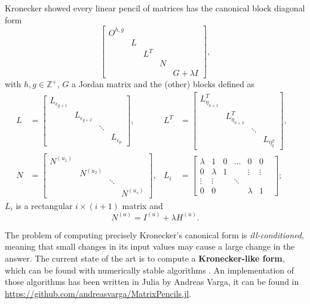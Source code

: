 \vspace{5mm}
Kronecker showed every linear pencil of matrices has the canonical block diagonal form
\[
\begin{bmatrix}
    O^{h, g} \\
    &L \\
    && L^T \\
    &&& N \\
    &&&& G + \lambda I
\end{bmatrix},
\]
with \(h, g \in \mathbb{Z}^+\), $G$ a Jordan matrix and the (other) blocks defined as
\begin{align*}
    L &= \begin{bmatrix}
        L_{\epsilon_{g+1}} \\
        & L_{\epsilon_{g+2}} \\
        & & \ddots \\
        & & & L_{\epsilon_{p}}
    \end{bmatrix}, &
    L^T &= \begin{bmatrix}
        L_{\eta_{h+1}}^T \\
        & L_{\eta_{h+2}}^T \\
        & & \ddots \\
        & & & L_{\eta_{q}^T}
    \end{bmatrix}, &\\
    N &= \begin{bmatrix}
        N^{(u_{1})} \\
        & N^{(u_{2})} \\ 
        & & \ddots \\
        & & & N^{(u_{s})}
    \end{bmatrix}, &
    L_{i} &=
    \begin{bmatrix}
        \lambda        &      1     &       0      &     \ldots       &    0       &    0   \\
        0              & \lambda    &       1      &                  & \vdots     & \vdots \\
        \vdots         & \vdots     &     & \ddots    &      &            &        \\
        0              &      0     &              &                  & \lambda    &    1   
    \end{bmatrix};
\end{align*}
\(L_{i}\) is a rectangular \(i \times (i + 1)\) matrix and
\[
    N^{(u)} = I^{(u)} + \lambda H^{(u)}.
\]

The problem of computing precisely Kronecker's canonical form is \textit{ill-conditioned}, meaning
that small changes in its input values may cause a large change in the answer. The current state of the art is to
compute a \textbf{Kronecker-like form}, which can be found with numerically stable algorithms
\cite{beelen-van_dooren}. An implementation of those
algorithms has been written in Julia \cite{bezanson2017julia} by Andreas Varga, it can be found in
\url{https://github.com/andreasvarga/MatrixPencils.jl}.

